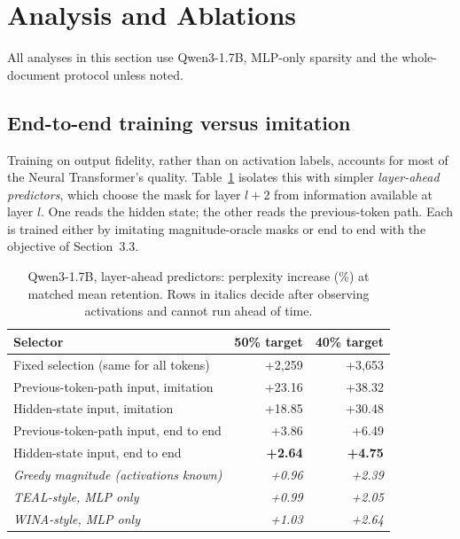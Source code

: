 \documentclass[10pt,twocolumn,letterpaper]{article}
\begin{document}
\section{Analysis and Ablations}

All analyses in this section use Qwen3-1.7B, MLP-only sparsity and the whole-document protocol unless noted.

\subsection{End-to-end training versus imitation}

Training on output fidelity, rather than on activation labels, accounts for most of the Neural Transformer's quality. Table~\ref{tab:e2e} isolates this with simpler \emph{layer-ahead predictors}, which choose the mask for layer $l+2$ from information available at layer $l$. One reads the hidden state; the other reads the previous-token path. Each is trained either by imitating magnitude-oracle masks or end to end with the objective of Section~3.3.

\begin{table}[t]
\centering
\caption{Qwen3-1.7B, layer-ahead predictors: perplexity increase (\%) at matched mean retention. Rows in italics decide after observing activations and cannot run ahead of time.}
\label{tab:e2e}
\small
\setlength{\tabcolsep}{4pt}
\begin{tabular}{@{}lrr@{}}
\toprule
Selector & 50\% target & 40\% target \\
\midrule
Fixed selection (same for all tokens) & +2,259 & +3,653 \\
\addlinespace
Previous-token-path input, imitation & +23.16 & +38.32 \\
Hidden-state input, imitation & +18.85 & +30.48 \\
\addlinespace
Previous-token-path input, end to end & +3.86 & +6.49 \\
Hidden-state input, end to end & \textbf{+2.64} & \textbf{+4.75} \\
\midrule
\textit{Greedy magnitude (activations known)} & \textit{+0.96} & \textit{+2.39} \\
\textit{TEAL-style, MLP only} & \textit{+0.99} & \textit{+2.05} \\
\textit{WINA-style, MLP only} & \textit{+1.03} & \textit{+2.64} \\
\bottomrule
\end{tabular}
\end{table}
\end{document}
